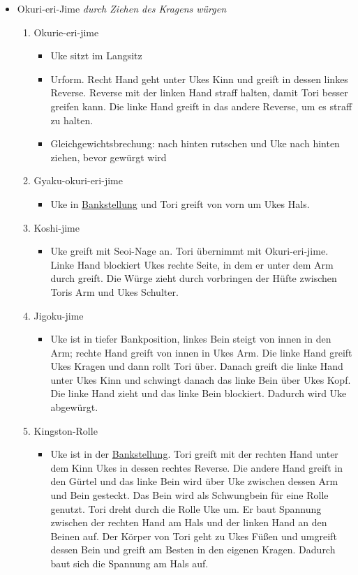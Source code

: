 \documentclass[justified, a4paper, notitlepage, captions=tableheading, nobib]{tufte-handout}
\begin{document}
\begin{itemize}
\item Okuri-eri-Jime 
\emph{durch Ziehen des Kragens würgen}

\begin{enumerate}
\item Okurie-eri-jime
\begin{itemize}
\item Uke sitzt im Langsitz
\item Urform. Recht Hand geht unter Ukes Kinn und greift in dessen linkes Reverse. Reverse mit der linken Hand straff halten, damit Tori besser greifen kann. Die  linke Hand greift in das andere Reverse, um es straff zu halten.
\item Gleichgewichtsbrechung: nach hinten rutschen und Uke nach hinten ziehen, bevor gewürgt wird
\end{itemize}
\item Gyaku-okuri-eri-jime 
\begin{itemize}
\item Uke in \hyperref[orgf95c5ab]{Bankstellung} und Tori greift von vorn um Ukes Hals.
\end{itemize}
\item Koshi-jime 
\begin{itemize}
\item Uke greift mit Seoi-Nage an. Tori übernimmt mit Okuri-eri-jime. Linke Hand blockiert Ukes rechte Seite, in dem er unter dem Arm durch greift. Die Würge zieht durch vorbringen der Hüfte zwischen Toris Arm und Ukes Schulter.
\end{itemize}
\item Jigoku-jime 
\begin{itemize}
\item Uke ist in tiefer Bankposition, linkes Bein steigt von innen in den Arm; rechte Hand greift von innen in Ukes Arm. Die linke Hand greift Ukes Kragen und dann rollt Tori über. Danach greift die linke Hand unter Ukes Kinn und schwingt danach das linke Bein über Ukes Kopf. Die linke Hand zieht und das linke Bein blockiert. Dadurch wird Uke abgewürgt.
\end{itemize}
\item Kingston-Rolle 
\begin{itemize}
\item Uke ist in der \hyperref[orgf95c5ab]{Bankstellung}. Tori greift mit der rechten Hand unter dem Kinn Ukes in dessen rechtes Reverse. Die andere Hand greift in den Gürtel und das linke Bein wird über Uke zwischen dessen Arm und Bein gesteckt. Das Bein wird als Schwungbein für eine Rolle genutzt. Tori dreht durch die Rolle Uke um.  Er baut Spannung zwischen der rechten Hand am Hals und der linken Hand an den Beinen auf. Der Körper von Tori geht zu Ukes Füßen und umgreift dessen Bein und greift am Besten in den eigenen Kragen. Dadurch baut sich die Spannung am Hals auf.
\end{itemize}
\end{enumerate}


\end{itemize}
\end{document}
